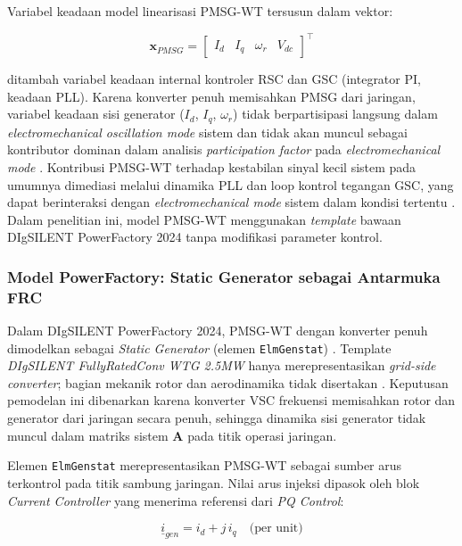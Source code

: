 Variabel keadaan model linearisasi PMSG-WT tersusun dalam vektor:

\begin{equation}
  \mathbf{x}_{PMSG} =
  \begin{bmatrix}I_d & I_q & \omega_r & V_{dc}\end{bmatrix}^\top
  \label{eq:pmsg-statevec}
\end{equation}

ditambah variabel keadaan internal kontroler RSC dan GSC (integrator PI, keadaan PLL).
Karena konverter penuh memisahkan PMSG dari jaringan, variabel keadaan sisi
generator ($I_d$, $I_q$, $\omega_r$) tidak berpartisipasi langsung dalam
\textit{electromechanical oscillation mode} sistem dan tidak akan muncul sebagai
kontributor dominan dalam analisis \textit{participation factor} pada \textit{electromechanical mode} \cite{knuppel2009small}. Kontribusi PMSG-WT terhadap kestabilan
sinyal kecil sistem pada umumnya dimediasi melalui dinamika PLL dan loop kontrol
tegangan GSC, yang dapat berinteraksi dengan \textit{electromechanical mode} sistem dalam kondisi
tertentu \cite{li2024smallsignal}. Dalam penelitian ini, model PMSG-WT menggunakan
\textit{template} bawaan DIgSILENT PowerFactory 2024 \cite{digsilent2024frc} tanpa
modifikasi parameter kontrol.

\subsubsection{Model PowerFactory: Static Generator sebagai Antarmuka FRC}

Dalam DIgSILENT PowerFactory 2024, PMSG-WT dengan konverter penuh dimodelkan sebagai
\textit{Static Generator} (elemen \texttt{ElmGenstat}) \cite{digsilent2024sg}.
Template \textit{DIgSILENT FullyRatedConv WTG 2.5MW} hanya merepresentasikan
\textit{grid-side converter}; bagian mekanik rotor dan aerodinamika tidak disertakan
\cite{digsilent2024frc}. Keputusan pemodelan ini dibenarkan karena konverter VSC
frekuensi memisahkan rotor dan generator dari jaringan secara penuh, sehingga dinamika
sisi generator tidak muncul dalam matriks sistem $\mathbf{A}$ pada titik operasi
jaringan.

Elemen \texttt{ElmGenstat} merepresentasikan PMSG-WT sebagai sumber arus terkontrol
pada titik sambung jaringan. Nilai arus injeksi dipasok oleh blok \textit{Current
Controller} yang menerima referensi dari \textit{PQ Control}:

\begin{equation}
  \underline{i}_{gen} = i_d + j\,i_q \quad \text{(per unit)}
  \label{eq:frc-igen}
\end{equation}

